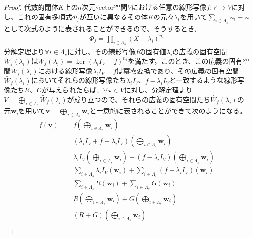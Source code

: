 \documentclass[dvipdfmx]{jsarticle}
\begin{document}
\begin{proof}
代数的閉体$K$上の$n$次元vector空間$V$における任意の線形写像$f:V \rightarrow V$に対し、これの固有多項式$\varPhi_{f}$が互いに異なるその体$K$の元々$\lambda_{i}$を用いて$\sum_{i \in \varLambda_{s}} n_{i} = n$として次式のように表されることができるので、そうするとき、
\begin{align*}
\varPhi_{f} = \prod_{i \in \varLambda_{s}} \left( X - \lambda_{i} \right)^{n_{i}}
\end{align*}
分解定理より$\forall i \in \varLambda_{s}$に対し、その線形写像$f$の固有値$\lambda_{i}$の広義の固有空間$\widetilde{W_{f}}\left( \lambda_{i} \right)$は$\widetilde{W_{f}}\left( \lambda_{i} \right) = \ker\left( \lambda_{i}I_{V} - f \right)^{n_{i}}$を満たす。このとき、この広義の固有空間$\widetilde{W_{f}}\left( \lambda_{i} \right)$における線形写像$\lambda_{i}I_{V} - f$は冪零変換であり、その広義の固有空間$\widetilde{W_{f}}\left( \lambda_{i} \right)$においてそれらの線形写像たち$\lambda_{i}I_{V}$、$f - \lambda_{i}I_{V}$と一致するような線形写像たち$R$、$G$が与えられたらば、$\forall\mathbf{v} \in V$に対し、分解定理より$V = \bigoplus_{i \in \varLambda_{s}} {\widetilde{W_{f}}\left( \lambda_{i} \right)}$が成り立つので、それらの広義の固有空間たち$\widetilde{W_{f}}\left( \lambda_{i} \right)$の元$\mathbf{w}_{i}$を用いて$\mathbf{v} = \bigoplus_{i \in \varLambda_{s}} \mathbf{w}_{i}$と一意的に表されることができて次のようになる。
\begin{align*}
f\left( \mathbf{v} \right) &= f\left( \bigoplus_{i \in \varLambda_{s}} \mathbf{w}_{i} \right) \\
&= \left( \lambda_{i}I_{V} + f - \lambda_{i}I_{V} \right)\left( \bigoplus_{i \in \varLambda_{s}} \mathbf{w}_{i} \right) \\
&= \lambda_{i}I_{V}\left( \bigoplus_{i \in \varLambda_{s}} \mathbf{w}_{i} \right) + \left( f - \lambda_{i}I_{V} \right)\left( \bigoplus_{i \in \varLambda_{s}} \mathbf{w}_{i} \right) \\
&= \sum_{i \in \varLambda_{s}} {\lambda_{i}I_{V}\left( \mathbf{w}_{i} \right)} + \sum_{i \in \varLambda_{s}} {\left( f - \lambda_{i}I_{V} \right)\left( \mathbf{w}_{i} \right)} \\
&= \sum_{i \in \varLambda_{s}} {R\left( \mathbf{w}_{i} \right)} + \sum_{i \in \varLambda_{s}} {G\left( \mathbf{w}_{i} \right)} \\
&= R\left( \bigoplus_{i \in \varLambda_{s}} \mathbf{w}_{i} \right) + G\left( \bigoplus_{i \in \varLambda_{s}} \mathbf{w}_{i} \right) \\
&= (R + G)\left( \bigoplus_{i \in \varLambda_{s}} \mathbf{w}_{i} \right) \\

\end{align*}
\end{proof}
\end{document}
